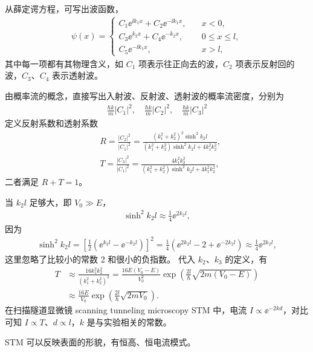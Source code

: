 从薛定谔方程，可写出波函数，
\begin{align}
    \psi(x) = \begin{cases}
        C_1 \ee^{\ii k_1 x} + C_2 \ee^{-\ii k_1 x},\quad &x<0, \\
        C_3 \ee^{k_2 x} + C_4 \ee^{-k_2 x},\quad &0\leqslant x \leqslant l,\\
        C_5 \ee^{-\ii k_1 x}, \quad &x>l,
    \end{cases}
\end{align}
其中每一项都有其物理含义，如 $C_1$ 项表示往正向去的波，$C_2$ 项表示反射回的波，$C_3$、$C_4$ 表示透射波。

由概率流的概念，直接写出入射波、反射波、透射波的概率流密度，分别为
\begin{align}
    \frac{\hbar k}{m} |C_1|^2, \quad \frac{\hbar k}{m} |C_2|^2, \quad \frac{\hbar k}{m} |C_3|^2
\end{align}
定义反射系数和透射系数
\begin{align}
    &R = \frac{|C_2|^2}{|C_1|^2} = 
    \frac{(k_1^2 + k_2^2)^2 \sinh^2  k_2 l} {(k_1^2 + k_2^2) \sinh^2 k_2l + 4 k_1^2 k_2^2}, \\
    &T = \frac{|C_3|^2}{|C_1|^2} = 
    \frac{4 k_1^2 k_2^2} {(k_1^2 + k_2^2) \sinh^2 k_2l + 4 k_1^2 k_2^2},
\end{align}
二者满足 $R+T=1$。

当 $k_2l$ 足够大，即 $V_0 \gg E$，
\begin{align}
    \sinh^2 k_2l \approx \frac 14 \ee^{2k_2 l},
\end{align}
因为
\begin{align}
    \sinh^2 k_2 l = \left[\frac12\left(\ee^{k_2l} - \ee^{-k_2l}\right)\right]^2 = \frac14 \left(\ee^{2k_2 l} - 2 + \ee^{-2k_2 l}\right) \approx \frac 14 \ee^{2k_2 l},
\end{align}
这里忽略了比较小的常数 2 和很小的负指数。
代入 $k_2$、$k_3$ 的定义，有
\begin{align}
    T &\approx \frac{16 k_1^2 k_2^2}{(k_1^2 + k_2^2)^2} = \frac{16E(V_0 - E)}{V_0^2} \exp\left(\frac{2l}{\hbar}\sqrt{2m(V_0 - E)}\right) \\
    &\approx \frac{16 E}{V_0} \exp\left(\frac{2l}{\hbar}\sqrt{2m V_0}\right). 
\end{align}
在扫描隧道显微镜 scanning tunneling microscopy STM 中，电流 $I \propto \ee^{-2 k d}$，对比可知 $I \propto T$、$d\propto l$，$k$ 是与实验相关的常数。

STM 可以反映表面的形貌，有恒高、恒电流模式。

